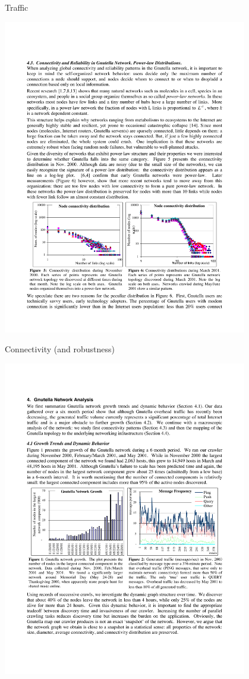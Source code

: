 \begin{frame}{Traffic}
	
\includegraphics[width=0.8\textwidth]{mapping2}	

\end{frame}

\begin{frame}{Connectivity (and robustness)}
	
\includegraphics[width=0.8\textwidth]{mapping1}

\end{frame}

